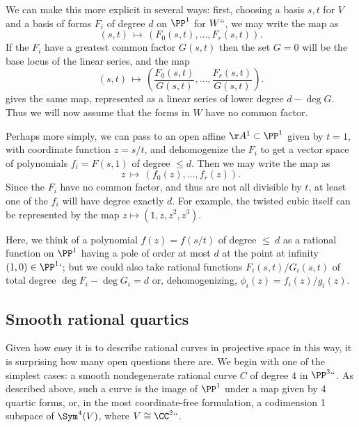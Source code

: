 \begingroup \let\;\,
We can make this more explicit in several ways: first, choosing a basis $s,t$ for $V$ and a basis of forms $F_i$ of degree $d$ on $\PP^1$ for $W` `$, we may write the map as
$$
(s,t) \; \mapsto \; \left(F_0(s,t), \dots, F_r(s,t)\right).
$$
If the $F_i$ have a greatest common factor $G(s,t)$ then the set $G=0$ will be the base locus
of the linear series, and the map
$$
(s,t) \; \mapsto \; \left( \frac{F_0(s,t)}{G(s,t)}, \dots, \frac{F_r(s,t)}{G(s,t)}\right).
$$
gives the same map, represented as a linear series of lower degree $d-\deg G$. Thus we
will now assume that the forms in $W$ have no common factor.

Perhaps
more simply,
we can pass to an open affine
$\AA^1\subset\PP^1$
given by $t=1$,
with coordinate function $z = s/t$, and
dehomogenize the $F_i$ to get a vector space of polynomials $f_i = F(s,1)$ of degree $\leq d$. Then we may write the
map as
$$
z \; \mapsto \; (f_0(z), \dots, f_r(z)).
$$
Since the $F_i$ have no common factor, and
thus
are not all divisible by $t$, at least one of the
$f_i$ will have degree exactly $d$.
For example, the twisted cubic itself can be represented by the map
$z \mapsto (1, z,z^2,z^3)$.

Here, we think of a polynomial $f(z) = f(s/t)$ of degree $\leq\ d$
as a rational function on $\PP^1$ having
a pole of order at most $d$ at the point at infinity $(1,0)\in \PP^1`$; but we could also take rational
functions $F_i(s,t)/G_i(s,t)$ of total degree $\deg F_i-\deg G_i = d$ or, dehomogenizing, $\phi_i(z) = f_i(z)/g_i(z)$.
\endgroup

\subsection*{Smooth rational quartics}

Given how easy it is to describe rational curves in projective space
%
%
in this way, it is surprising how many open questions there are. We
begin with
one of the simplest cases: a smooth nondegenerate rational curve $C$ of degree $4$ in $\PP^3` `$.
As described above, such a curve is the image of $\PP^1$ under a map given by 4 quartic forms,
or, in the most coordinate-free formulation, a codimension 1 subspace of $\Sym^4(V)$, where
$V\cong \CC^2` `$.

